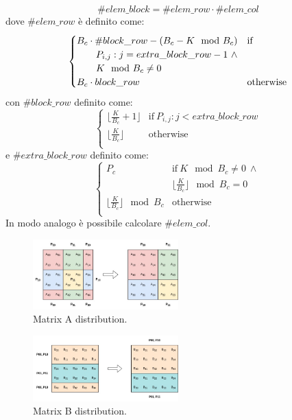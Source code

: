 \documentclass[conference]{IEEEtran}
\begin{document}
\begin{equation}
    \#elem\_block=\#elem\_row\cdot \#elem\_col
\end{equation}
dove $\#elem\_row$ è definito come:
\begin{equation}
    \begin{cases}
        B_c\cdot \#block\_row-(B_c-K \mod B_c) &  \text{if}\ \\
        \text{\quad}\text{\quad} P_{i,j} : j=extra\_block\_row-1 \ \land \\ 
        \text{\quad} \text{\quad}K \mod B_c \neq 0\\
        B_c\cdot block\_row & \text{otherwise}\\
    \end{cases} 
\end{equation}
con $\#block\_row$ definito come:
\begin{equation}
    \begin{cases}
        \lfloor\frac{K}{B_c}+1\rfloor &  \text{if}\ P_{i,j} : j<extra\_block\_row\\
        \lfloor\frac{K}{B_c}\rfloor & \text{otherwise}\\
    \end{cases} 
\end{equation}
e $\#extra\_block\_row$ definito come:
\begin{equation}
    \begin{cases}
        P_c &  \text{if}\ K \mod B_c \neq 0 \ \land \\
        & \lfloor\frac{K}{B_c}\rfloor \mod B_c=0\\
        \lfloor\frac{K}{B_c}\rfloor \mod B_c & \text{otherwise}\\
    \end{cases} 
\end{equation}
In modo analogo è possibile calcolare $\#elem\_col$.
\begin{figure}
    \centering
    \includegraphics[width=0.5\textwidth]{resources/matrixA_2d_block_cyclic_distribution.jpg}
    \caption{Matrix A distribution.}
    \label{fig:matrix_a_distribution}
\end{figure}
\begin{figure}
    \centering
    \includegraphics[width=0.5\textwidth]{resources/matrixB_row_block_cyclic_distribution.jpg}
    \caption{Matrix B distribution.}
    \label{fig:matrix_b_distribution}
\end{figure}
\end{document}
